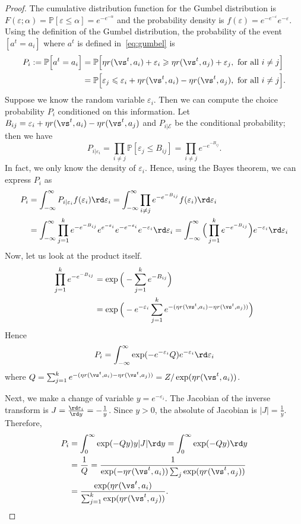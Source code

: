 \documentclass{article} %
\begin{document}
\begin{proof}
The cumulative distribution function for the Gumbel distribution is $F(\varepsilon;\alpha) = \mathbb{P}[\varepsilon \leqslant \alpha ] = e^{-e^{-\alpha}}$ and the probability density is $f(\varepsilon) = e^{-e^{-\varepsilon}}e^{-\varepsilon} $. Using the definition of the Gumbel distribution, the probability of the event $[a^t = a_i]$ where $a^t$ is defined in~\eqref{eq:gumbel} is
\begin{align*}
    P_i :=  \mathbb{P} \Big[a^t = a_i\Big] &= \mathbb{P} \Big[ \eta r(\vs^t,a_i) +\varepsilon_i \geqslant \eta r(\vs^t,a_j) +\varepsilon_j ,  \text{ for all } i\neq j \Big]\\
    & =  \mathbb{P} \Big[\varepsilon_j \leqslant\varepsilon_i + \eta r(\vs^t,a_i)-\eta r(\vs^t,a_j),  \text{ for all } i\neq j \Big].
\end{align*}
Suppose we know the random variable $\varepsilon_i$. Then we can compute the choice probability $P_i$ conditioned on this information. Let $B_{ij} = \varepsilon_i +\eta r(\vs^t,a_i)-\eta r(\vs^t,a_j) $ and $P_{i|\mathcal{E}}$ be the conditional probability; then we have
\[
P_{i|\varepsilon_i} = \prod_{i \neq j} \mathbb{P}[\varepsilon_{j} \leqslant B_{ij}] = \prod_{i \neq j} e^{-e^{-B_{ij}}}.
\]
In fact, we only know the density of $\varepsilon_i$. Hence, using the Bayes theorem, we can express $P_i$ as
\begin{align*}
P_i & = \int_{-\infty}^{\infty} P_{i|\varepsilon_i} f(\varepsilon_i) \rd \varepsilon_i = \int_{-\infty}^{\infty} \prod_{i \neq j} e^{-e^{-B_{ij}}} f(\varepsilon_i) \rd \varepsilon_i \\
&  = \int_{-\infty}^{\infty} \prod_{j=1}^k e^{-e^{-B_{ij}}}   e^{e^{-\varepsilon_i}} e^{-e^{-\varepsilon_i}}e^{-\varepsilon_i} \rd \varepsilon_i= \int_{-\infty}^{\infty} \Big( \prod_{j=1}^k e^{-e^{-B_{ij}}} \Big)  e^{-\varepsilon_i} \rd \varepsilon_i
\end{align*}
Now, let us look at the product itself.
\begin{align*}
\prod_{j=1}^k e^{-e^{-B_{ij}}} & = \exp\Big( -\sum_{j=1}^k e^{-B_{ij}}\Big) \\
& = \exp \Big( - e^{-\varepsilon_i }\sum_{j=1}^k e^{- (\eta r(\vs^t,a_i)-\eta r(\vs^t,a_j) )} \Big)
\end{align*}
Hence
\[
P_i = \int_{-\infty}^{\infty} \exp(-e^{-\varepsilon_i } Q ) e^{-\varepsilon_i} \rd \varepsilon_i
\]
    where $Q = \sum_{j=1}^k e^{- (\eta r(\vs^t,a_i)-\eta r(\vs^t,a_j) )}  = Z/\exp(\eta r(\vs^t,a_i) )$.

Next, we make a change of variable $y = e^{-\varepsilon_i}$. The Jacobian of the inverse transform is $J = \frac{\rd \varepsilon_i}{\rd y} = -\frac{1}{y}$. Since $y>0$, the absolute of Jacobian is $|J| = \frac{1}{y}$. Therefore,
\begin{align*}
P_i & = \int_{0}^{\infty} \exp(-Q y) y |J| \rd y=\int_{0}^{\infty} \exp(-Q y)\rd y	\\
& = \frac{1}{Q} = \frac{1}{\exp(-\eta r(\vs^t,a_i)) \sum_j \exp(\eta r(\vs^t,a_j))}\\
& = \dfrac{\exp(\eta r(\vs^t, a_i)}{\sum_{j=1}^k \exp(\eta r(\vs^t, a_j))}.
\end{align*}
\end{proof}
\end{document}
